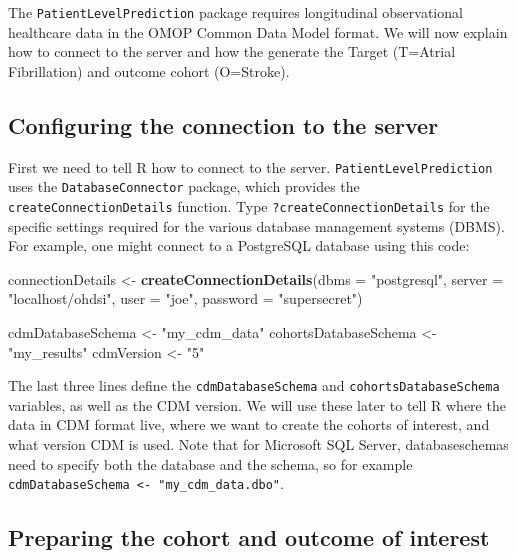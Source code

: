 \documentclass[]{article}
\newenvironment{Shaded}{\begin{snugshade}}{\end{snugshade}}
\newcommand{\KeywordTok}[1]{\textcolor[rgb]{0.13,0.29,0.53}{\textbf{#1}}}
\newcommand{\DataTypeTok}[1]{\textcolor[rgb]{0.13,0.29,0.53}{#1}}
\newcommand{\StringTok}[1]{\textcolor[rgb]{0.31,0.60,0.02}{#1}}
\newcommand{\NormalTok}[1]{#1}
\begin{document}
The \texttt{PatientLevelPrediction} package requires longitudinal
observational healthcare data in the OMOP Common Data Model format. We
will now explain how to connect to the server and how the generate the
Target (T=Atrial Fibrillation) and outcome cohort (O=Stroke).

\subsection{Configuring the connection to the
server}\label{configuring-the-connection-to-the-server}

First we need to tell R how to connect to the server.
\texttt{PatientLevelPrediction} uses the \texttt{DatabaseConnector}
package, which provides the \texttt{createConnectionDetails} function.
Type \texttt{?createConnectionDetails} for the specific settings
required for the various database management systems (DBMS). For
example, one might connect to a PostgreSQL database using this code:

\begin{Shaded}
\begin{Highlighting}[]
\NormalTok{connectionDetails <-}\StringTok{ }\KeywordTok{createConnectionDetails}\NormalTok{(}\DataTypeTok{dbms =} \StringTok{"postgresql"}\NormalTok{, }
                                             \DataTypeTok{server =} \StringTok{"localhost/ohdsi"}\NormalTok{, }
                                             \DataTypeTok{user =} \StringTok{"joe"}\NormalTok{, }
                                             \DataTypeTok{password =} \StringTok{"supersecret"}\NormalTok{)}

\NormalTok{cdmDatabaseSchema <-}\StringTok{ "my_cdm_data"}
\NormalTok{cohortsDatabaseSchema <-}\StringTok{ "my_results"}
\NormalTok{cdmVersion <-}\StringTok{ "5"}
\end{Highlighting}
\end{Shaded}

The last three lines define the \texttt{cdmDatabaseSchema} and
\texttt{cohortsDatabaseSchema} variables, as well as the CDM version. We
will use these later to tell R where the data in CDM format live, where
we want to create the cohorts of interest, and what version CDM is used.
Note that for Microsoft SQL Server, databaseschemas need to specify both
the database and the schema, so for example
\texttt{cdmDatabaseSchema\ \textless{}-\ "my\_cdm\_data.dbo"}.

\subsection{Preparing the cohort and outcome of
interest}\label{preparing-the-cohort-and-outcome-of-interest}
\end{document}
